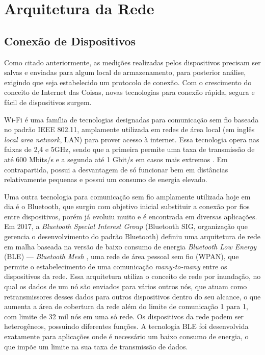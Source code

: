 \documentclass[../monografia.tex]{subfiles}
\begin{document}
\section{Arquitetura da Rede}

\subsection{Conexão de Dispositivos}
Como citado anteriormente, as medições realizadas pelos dispositivos precisam ser salvas e enviadas para algum local de armazenamento, para posterior análise, exigindo que seja estabelecido um protocolo de conexão. Com o crescimento do conceito de Internet das Coisas, novas tecnologias para conexão rápida, segura e fácil de dispositivos surgem.

Wi-Fi é uma família de tecnologias designadas para comunicação sem fio baseada no padrão IEEE 802.11, amplamente utilizada em redes de área local (em inglês \textit{local area network}, LAN) para prover acesso à internet. Essa tecnologia opera nas faixas de 2,4 e 5GHz, sendo que a primeira permite uma taxa de transmissão de até 600 Mbits/s e a segunda até 1 Gbit/s em casos mais extremos \cite{Wi-Fi-datarate}. Em contrapartida, possui a desvantagem de só funcionar bem em distâncias relativamente pequenas e possui um consumo de energia elevado.

Uma outra tecnologia para comunicação sem fio amplamente utilizada hoje em dia é o Bluetooth, que surgiu com objetivo inicial substituir a conexão por fios entre dispositivos, porém já evoluiu muito e é encontrada em diversas aplicações. Em 2017, a \textit{Bluetooth Special Interest Group} (Bluetooth SIG, organização que gerencia o desenvolvimento do padrão Bluetooth) definiu uma arquitetura de rede em malha baseada na versão de baixo consumo de energia \textit{Bluetooth Low Energy} (BLE) --- \textit{Bluetooth Mesh} \cite{BLE-mesh}, uma rede de área pessoal sem fio (WPAN), que permite o estabelecimento de uma comunicação \textit{many-to-many} entre os dispositivos da rede. Essa arquitetura utiliza o conceito de rede por inundação, no qual os dados de um nó são enviados para vários outros nós, que atuam como retransmissores desses dados para outros dispositivos dentro do seu alcance, o que aumenta a área de cobertura da rede além do limite de comunicação 1 para 1, com limite de 32 mil nós em uma só rede. Os dispositivos da rede podem ser heterogêneos, possuindo diferentes funções. A tecnologia BLE foi desenvolvida exatamente para aplicações onde é necessário um baixo consumo de energia, o que impõe um limite na sua taxa de transmissão de dados.
\end{document}
